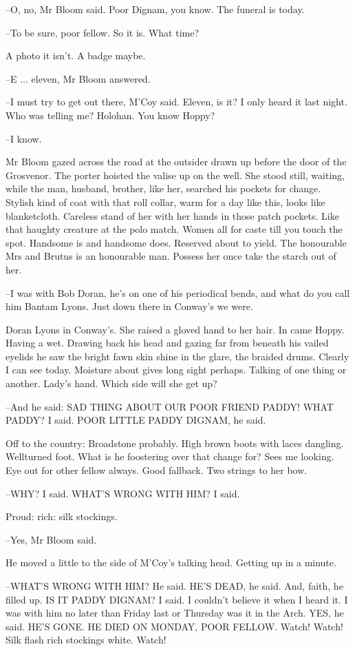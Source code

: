 --O, no, Mr Bloom said. Poor Dignam, you know. The funeral is today.

--To be sure, poor fellow. So it is. What time?

A photo it isn't. A badge maybe.

--E ... eleven, Mr Bloom answered.

--I must try to get out there, M'Coy said. Eleven, is it? I only heard it
last night. Who was telling me? Holohan. You know Hoppy?

--I know.

Mr Bloom gazed across the road at the outsider drawn up before the door
of the Grosvenor. The porter hoisted the valise up on the well. She stood
still, waiting, while the man, husband, brother, like her, searched his
pockets for change. Stylish kind of coat with that roll collar, warm for
a day like this, looks like blanketcloth. Careless stand of her with her
hands in those patch pockets. Like that haughty creature at the polo
match. Women all for caste till you touch the spot. Handsome is and
handsome does. Reserved about to yield. The honourable Mrs and Brutus is
an honourable man. Possess her once take the starch out of her.

--I was with Bob Doran, he's on one of his periodical bends, and what do
you call him Bantam Lyons. Just down there in Conway's we were.

Doran Lyons in Conway's. She raised a gloved hand to her hair. In came
Hoppy. Having a wet. Drawing back his head and gazing far from beneath
his vailed eyelids he saw the bright fawn skin shine in the glare, the
braided drums. Clearly I can see today. Moisture about gives long sight
perhaps. Talking of one thing or another. Lady's hand. Which side will
she get up?

--And he said: SAD THING ABOUT OUR POOR FRIEND PADDY! WHAT PADDY? I said.
POOR LITTLE PADDY DIGNAM, he said.

Off to the country: Broadstone probably. High brown boots with laces
dangling. Wellturned foot. What is he foostering over that change for?
Sees me looking. Eye out for other fellow always. Good fallback. Two
strings to her bow.

--WHY? I said. WHAT'S WRONG WITH HIM? I said.

Proud: rich: silk stockings.

--Yes, Mr Bloom said.

He moved a little to the side of M'Coy's talking head. Getting up in a
minute.

--WHAT'S WRONG WITH HIM? He said. HE'S DEAD, he said. And, faith, he
filled up. IS IT PADDY DIGNAM? I said. I couldn't believe it when I heard
it. I was with him no later than Friday last or Thursday was it in the
Arch. YES, he said. HE'S GONE. HE DIED ON MONDAY, POOR FELLOW. Watch!
Watch! Silk flash rich stockings white. Watch!

